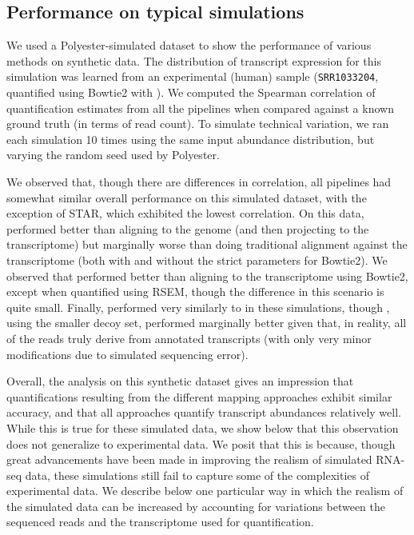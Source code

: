 \subsection{Performance on typical simulations}
\label{subsec:initial_sim}

We used a Polyester\citep{polyester}-simulated dataset to show the performance
of various methods on synthetic data. The distribution of transcript
expression for this simulation was learned from an experimental (human) sample
(\texttt{SRR1033204}, quantified using Bowtie2 with \salmon). We computed the
Spearman correlation of quantification estimates from all the pipelines when
compared against a known ground truth (in terms of read count). To simulate
technical variation, we ran each simulation 10 times using the same input
abundance distribution, but varying the random seed used by Polyester.

We observed that, though there are differences in correlation, all pipelines had
somewhat similar overall performance on this simulated dataset, with the
exception of STAR, which exhibited the lowest correlation. On this data, \qm
performed better than aligning to the genome (and then projecting to the
transcriptome) but marginally worse than doing traditional alignment
against the transcriptome (both with and without the strict parameters for
Bowtie2). We observed that \hsa performed better than aligning to
the transcriptome using Bowtie2, except when quantified using RSEM, though the
difference in this scenario is quite small. Finally, \saf performed very similarly
to \hsa in these simulations, though \hsa, using the smaller decoy set, performed marginally
better given that, in reality, all of the reads truly derive from annotated transcripts (with 
only very minor modifications due to simulated sequencing error).

Overall, the analysis on this synthetic dataset gives an impression that
quantifications resulting from the different mapping approaches exhibit similar
accuracy, and that all approaches quantify transcript abundances relatively
well. While this is true for these simulated data, we show below that this
observation does not generalize to experimental data. We posit that this is
because, though great advancements have been made in improving the realism of
simulated RNA-seq data, these simulations still fail to capture some of the
complexities of experimental data. We describe below one particular way in which
the realism of the simulated data can be increased by accounting for variations
between the sequenced reads and the transcriptome used for quantification.

